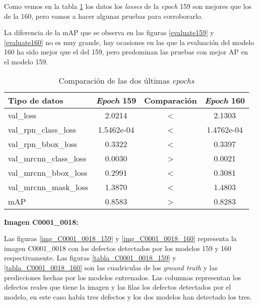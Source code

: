 Como vemos en la tabla \ref{comparacionepochs} los datos los \textit{losses} de la \textit{epoch} 159 son mejores que los de la 160, pero vamos a hacer algunas pruebas para corroborarlo.

La diferencia de la mAP \cite{AP} que se observa en las figuras \ref{evaluate159} y \ref{evaluate160} no es muy grande, hay ocasiones en las que la evaluación del modelo 160 ha sido mejor que el del 159, pero predominan las pruebas con mejor AP en el modelo 159.

\newpage

\begin{table}[h]
	\begin{center}
		\begin{tabular}{l | c c c}
			Tipo de datos & \textit{Epoch} 159 & Comparación & \textit{Epoch} 160\\ \hline
			val\_loss & 2.0214 & < & 2.1303\\
			val\_rpn\_class\_loss & 1.5462e-04 & < & 1.4762e-04\\
			val\_rpn\_bbox\_loss & 0.3322 & < & 0.3397\\
			val\_mrcnn\_class\_loss & 0.0030 & > & 0.0021\\
			val\_mrcnn\_bbox\_loss & 0.2991 & < & 0.3081\\
			val\_mrcnn\_mask\_loss & 1.3870 & < & 1.4803\\
			mAP & 0.8583 & > & 0.8283\\
		\end{tabular}
		\caption{Comparación de las dos últimas \textit{epochs}}
		\label{comparacionepochs}
	\end{center}
\end{table}


\textbf{Imagen C0001\_0018:}





Las figuras \ref{img_C0001_0018_159} y \ref{img_C0001_0018_160} representa la imagen C0001\_0018 con los defectos detectados por los modelos 159 y 160 respectivamente. Las figuras \ref{tabla_C0001_0018_159} y \ref{tabla_C0001_0018_160} son las cuadriculas de los \textit{ground truth} y las predicciones hechas por los modelos entrenados. Las columnas representan los defectos reales que tiene la imagen y las filas los defectos detectados por el modelo, en este caso había tres defectos y los dos modelos han detectado los tres.

